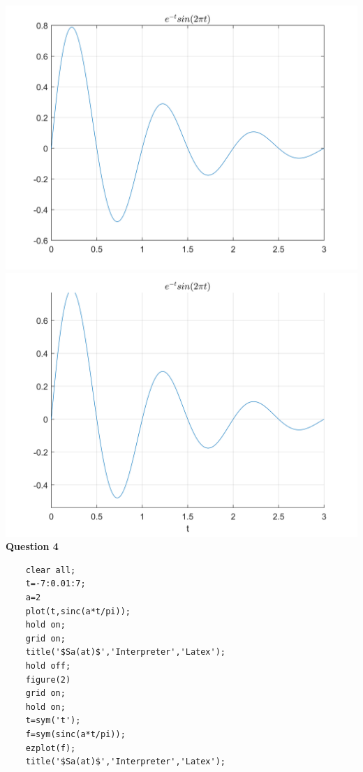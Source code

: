 \documentclass[UTF8,a4paper]{article}
\begin{document}
\includegraphics[scale=0.5]{8-3-1.png}
\includegraphics[scale=0.5]{8-3-2.png}\\
\textbf{Question 4}\\
\begin{lstlisting}
    clear all;
    t=-7:0.01:7;
    a=2
    plot(t,sinc(a*t/pi));
    hold on;
    grid on;
    title('$Sa(at)$','Interpreter','Latex');
    hold off;
    figure(2)
    grid on;
    hold on;
    t=sym('t');
    f=sym(sinc(a*t/pi));
    ezplot(f);
    title('$Sa(at)$','Interpreter','Latex');
\end{lstlisting}
\end{document}
